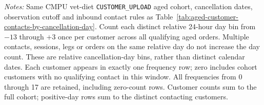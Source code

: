\begin{table}[!htbp]
\begin{minipage}{\linewidth}
\footnotesize
\textit{Notes:} Same CMPU vet-diet \texttt{CUSTOMER\_UPLOAD} aged cohort,
cancellation dates, observation cutoff and inbound contact rules as
Table~\ref{tab:aged-customer-contacts-by-cancellation-day}.
Count each distinct relative 24-hour day bin from $-13$ through $+3$ once
per customer across all qualifying aged orders. Multiple contacts, sessions,
legs or orders on the same relative day do not increase the day count.
These are relative cancellation-day bins, rather than distinct calendar dates.
Each customer appears in exactly one frequency row; zero includes cohort
customers with no qualifying contact in this window. All frequencies from
0 through 17 are retained, including zero-count rows. Customer counts sum to
the full cohort; positive-day rows sum to the distinct contacting customers.
\end{minipage}
\end{table}
